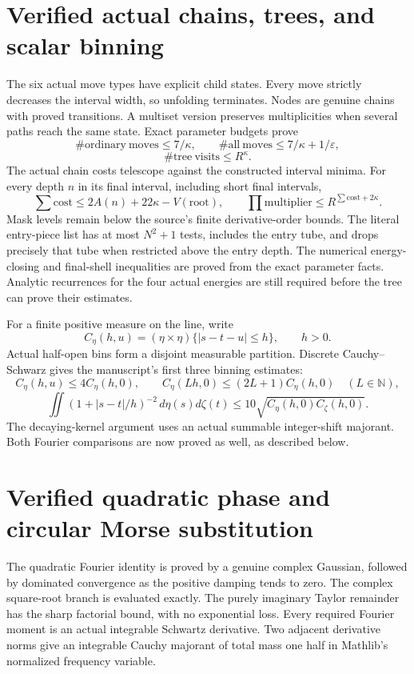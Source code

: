\documentclass[11pt]{article}
\begin{document}
\section*{Verified actual chains, trees, and scalar binning}
The six actual move types have explicit child states. Every move strictly
 decreases the interval width, so unfolding terminates. Nodes are genuine
chains with proved transitions. A multiset version preserves multiplicities
when several paths reach the same state. Exact parameter budgets prove
\[
\#\mathrm{ordinary\ moves}\le7/\kappa,\qquad
\#\mathrm{all\ moves}\le7/\kappa+1/\varepsilon,
\]
\[
\#\mathrm{tree\ visits}\le R^\kappa.
\]
The actual chain costs telescope against the constructed interval minima.
For every depth $n$ in its final interval, including short final intervals,
\[
\sum\mathrm{cost}\le2A(n)+22\kappa-V(\mathrm{root}),\qquad
\prod\mathrm{multiplier}\le R^{\sum\mathrm{cost}+2\kappa}.
\]
Mask levels remain below the source's finite derivative-order bounds. The
literal entry-piece list has at most $N^2+1$ tests, includes the entry tube, and
 drops precisely that tube when restricted above the entry depth. The
numerical energy-closing and final-shell inequalities are proved from the
exact parameter facts. Analytic recurrences for the four actual energies
are still required before the tree can prove their estimates.

For a finite positive measure on the line, write
\[
C_\eta(h,u)=(\eta\times\eta)\{|s-t-u|\le h\},\qquad h>0.
\]
Actual half-open bins form a disjoint measurable partition. Discrete
Cauchy--Schwarz gives the manuscript's first three binning estimates:
\[
C_\eta(h,u)\le4C_\eta(h,0),\qquad
C_\eta(Lh,0)\le(2L+1)C_\eta(h,0)\quad(L\in\mathbb N),
\]
\[
\iint(1+|s-t|/h)^{-2}\,d\eta(s)d\zeta(t)
\le10\sqrt{C_\eta(h,0)C_\zeta(h,0)}.
\]
The decaying-kernel argument uses an actual summable integer-shift majorant.
Both Fourier comparisons are now proved as well, as described below.

\newpage
\section*{Verified quadratic phase and circular Morse substitution}
The quadratic Fourier identity is proved by a genuine complex Gaussian,
followed by dominated convergence as the positive damping tends to zero.
The complex square-root branch is evaluated exactly. The purely imaginary
Taylor remainder has the sharp factorial bound, with no exponential loss.
Every required Fourier moment is an actual integrable Schwartz derivative.
Two adjacent derivative norms give an integrable Cauchy majorant of total
mass one half in Mathlib's normalized frequency variable.
\end{document}
